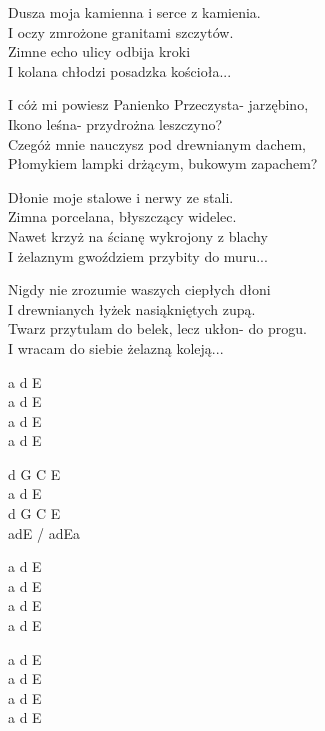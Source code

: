 \begin{text}
Dusza moja kamienna i serce z kamienia.\\
I oczy zmrożone granitami szczytów.\\
Zimne echo ulicy odbija kroki\\
I kolana chłodzi posadzka kościoła...

\vin I cóż mi powiesz Panienko Przeczysta- jarzębino,\\
\vin Ikono leśna- przydrożna leszczyno?\\
\vin Czegóż mnie nauczysz pod drewnianym dachem,\\
\vin Płomykiem lampki drżącym, bukowym zapachem?

Dłonie moje stalowe i nerwy ze stali.\\
Zimna porcelana, błyszczący widelec.\\
Nawet krzyż na ścianę wykrojony z blachy\\
I żelaznym gwoździem przybity do muru...

Nigdy nie zrozumie waszych ciepłych dłoni\\
I drewnianych łyżek nasiąkniętych zupą.\\
Twarz przytulam do belek, lecz ukłon- do progu.\\
I wracam do siebie żelazną koleją...
\end{text}
\begin{chord}
    a d E\\
    a d E\\
    a d E\\
    a d E

    d G C E\\
    a d E\\
    d G C E\\
    adE / adEa

    a d E\\
    a d E\\
    a d E\\
    a d E

    a d E\\
    a d E\\
    a d E\\
    a d E
\end{chord}